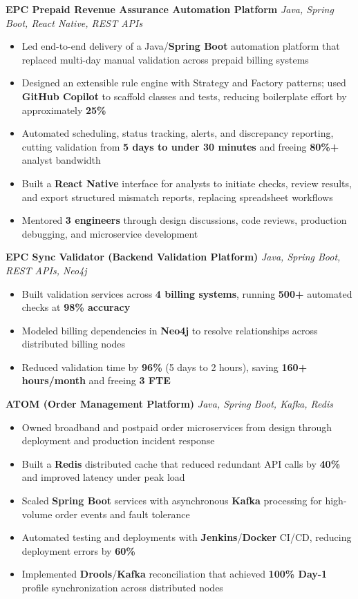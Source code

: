 \documentclass[letterpaper,11pt]{article}
\newcommand{\resumeItem}[1]{
  \item\small{{#1 \vspace{-2pt}}}
}
\newcommand{\resumeItemListStart}{\begin{itemize}}
\newcommand{\resumeItemListEnd}{\end{itemize}\vspace{-5pt}}
\begin{document}
      \vspace{4pt}
      \textbf{\small EPC Prepaid Revenue Assurance Automation Platform} \hfill \textit{\small Java, Spring Boot, React Native, REST APIs} \\
      \vspace{-2pt}
      \resumeItemListStart
        \resumeItem{Led end-to-end delivery of a Java/\textbf{Spring Boot} automation platform that replaced multi-day manual validation across prepaid billing systems}
        \resumeItem{Designed an extensible rule engine with Strategy and Factory patterns; used \textbf{GitHub Copilot} to scaffold classes and tests, reducing boilerplate effort by approximately \textbf{25\%}}
        \resumeItem{Automated scheduling, status tracking, alerts, and discrepancy reporting, cutting validation from \textbf{5 days to under 30 minutes} and freeing \textbf{80\%+} analyst bandwidth}
        \resumeItem{Built a \textbf{React Native} interface for analysts to initiate checks, review results, and export structured mismatch reports, replacing spreadsheet workflows}
        \resumeItem{Mentored \textbf{3 engineers} through design discussions, code reviews, production debugging, and microservice development}
      \resumeItemListEnd

      \vspace{4pt}
      \textbf{\small EPC Sync Validator (Backend Validation Platform)} \hfill \textit{\small Java, Spring Boot, REST APIs, Neo4j} \\
      \vspace{-2pt}
      \resumeItemListStart
        \resumeItem{Built validation services across \textbf{4 billing systems}, running \textbf{500+} automated checks at \textbf{98\% accuracy}}
        \resumeItem{Modeled billing dependencies in \textbf{Neo4j} to resolve relationships across distributed billing nodes}
        \resumeItem{Reduced validation time by \textbf{96\%} (5 days to 2 hours), saving \textbf{160+ hours/month} and freeing \textbf{3 FTE}}
      \resumeItemListEnd

      \vspace{4pt}
      \textbf{\small ATOM (Order Management Platform)} \hfill \textit{\small Java, Spring Boot, Kafka, Redis} \\
      \vspace{-2pt}
      \resumeItemListStart
        \resumeItem{Owned broadband and postpaid order microservices from design through deployment and production incident response}
        \resumeItem{Built a \textbf{Redis} distributed cache that reduced redundant API calls by \textbf{40\%} and improved latency under peak load}
        \resumeItem{Scaled \textbf{Spring Boot} services with asynchronous \textbf{Kafka} processing for high-volume order events and fault tolerance}
        \resumeItem{Automated testing and deployments with \textbf{Jenkins}/\textbf{Docker} CI/CD, reducing deployment errors by \textbf{60\%}}
        \resumeItem{Implemented \textbf{Drools}/\textbf{Kafka} reconciliation that achieved \textbf{100\% Day-1} profile synchronization across distributed nodes}
      \resumeItemListEnd
\end{document}
